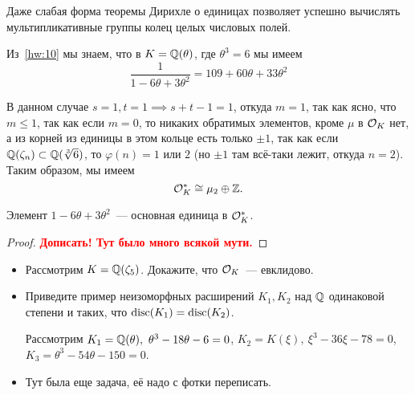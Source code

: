 	Даже слабая форма теоремы Дирихле о единицах позволяет успешно вычислять мультипликативные группы колец целых числовых полей. 

	\begin{example}
		Из~\ref{hw:10} мы знаем, что в $K = \mathbb{Q}(\theta)$, где $\theta^3 = 6$ мы имеем
		\[ \frac{1}{1 - 6 \theta + 3\theta^2} = 109 + 60\theta + 33\theta^2 \]

		В данном случае $s = 1, t = 1 \implies s + t - 1 = 1$, откуда $m = 1$, так как ясно, что $m \le 1$, так как если $m = 0$, то никаких обратимых элементов, кроме $\mu$ в $\mathcal{O}_{K}$ нет, а из корней из единицы в этом кольце есть только $\pm 1$, так как  если $\mathbb{Q}(\zeta_n) \subset \mathbb{Q}(\sqrt[3]{6})$, то $\varphi(n) = 1$ или $2$ (но $\pm 1$ там всё-таки лежит, откуда $n = 2$). Таким образом, мы имеем 
		\[
			\mathcal{O}_{K}^* \cong \mu_{2} \oplus \mathbb{Z}.
		\]
	\end{example}

	\begin{statement} 
		Элемент $1 - 6\theta + 3\theta^2$~--- основная единица в $\mathcal{O}_{K}^*$.
	\end{statement}
		
	\begin{proof}
		\bf{\textcolor{red}{Дописать! Тут было много всякой мути.}}
	\end{proof}

	\begin{homework}\label{hw:11}
	\begin{itemize}
		\item Рассмотрим $K = \mathbb{Q}(\zeta_{5})$. Докажите, что $\mathcal{O}_{K}$~--- евклидово. 

		\item Приведите пример неизоморфных расширений $K_1, K_2$ над $\mathbb{Q}$ одинаковой степени и таких, что $\operatorname{disc}(K_1) = \operatorname{disc}(K_2)$.

		Рассмотрим $K_1 = \mathbb{Q}(\theta), \ \theta^3 - 18\theta - 6 = 0$, $K_2 = K(\xi), \ \xi^3 - 36\xi - 78 = 0$, $K_3 = \theta^3 - 54\theta - 150 = 0$.

		\item Тут была еще задача, её надо с фотки переписать. 
	\end{itemize}
	\end{homework}





